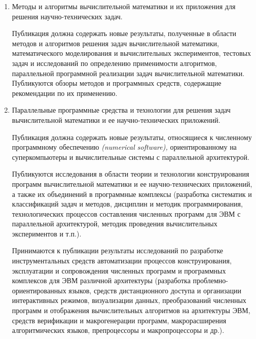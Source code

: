 \documentclass[10pt,a4paper]{book}
\begin{document}
\begin{enumerate}[itemsep=0pt,parsep=2pt,topsep=2pt,partopsep=0pt]
\item Методы и алгоритмы вычислительной математики и их приложения для решения
       научно-тех\-ни\-чес\-ких задач.

       Публикация должна содержать новые результаты, полученные в области
       методов и алгоритмов решения задач вычислительной математики,
       математического моделирования и вычислительных экспериментов,
       тестовых задач и исследований по определению применимости
       алгоритмов, параллельной программной реализации задач вычислительной
       математики. Публикуются обзоры методов и программных средств,
       содержащие рекомендации по их применению.

\item Параллельные программные средства и технологии для решения задач
       вычислительной математики и ее научно-технических приложений.

       Публикация должна содержать новые результаты, относящиеся
       к численному программному обеспечению {\itshape (numerical software),}
       ориентированному на суперкомпьютеры и вычислительные системы с
       параллельной архитектурой.

       Публикуются исследования в области теории и технологии конструирования
       программ вычислительной математики и ее научно-технических приложений,
       а также их объединений в программные комплексы (разработка систематик
       и классификаций задач и методов, дисциплин и методик программирования,
       технологических процессов составления численных программ для ЭВМ с
       параллельной архитектурой, методик проведения вычислительных
       экспериментов и т.п.).

       Принимаются к публикации результаты исследований по разработке
       инструментальных средств автоматизации процессов конструирования,
       эксплуатации и сопровождения численных программ и программных комплексов для ЭВМ
       различной архитектуры (разработка проблемно-ори\-ен\-ти\-ро\-ван\-ных языков,
       средств дистанционного доступа и организации интерактивных режимов, визуализации
       данных, преобразований численных программ и отображения вычислительных алгоритмов 
       на архитектуры ЭВМ, средств верификации и макрогенерации программ, макрорасширения
       алгоритмических языков, препроцессоры и макропроцессоры и др.).

\end{enumerate}
\end{document}

